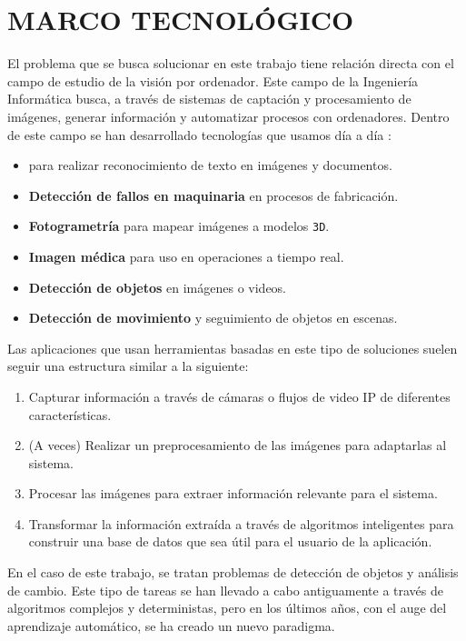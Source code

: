 \section{MARCO TECNOLÓGICO}

El problema que se busca solucionar en este trabajo tiene relación directa con el campo de estudio de la visión por ordenador. Este campo de la Ingeniería Informática busca, 
a través de sistemas de captación y procesamiento de imágenes, generar información y automatizar procesos con ordenadores. \newline Dentro de este campo se han desarrollado tecnologías que usamos día a día
\cite{szeliskiComputerVisionAlgorithms2022}:

\begin{itemize}
    \item \textbf{\textit{}} para realizar reconocimiento de texto en imágenes y documentos.
    \item \textbf{Detección de fallos en maquinaria} en procesos de fabricación.
    \item \textbf{Fotogrametría} para mapear imágenes a modelos \texttt{3D}.
    \item \textbf{Imagen médica} para uso en operaciones a tiempo real\cite{NEMESIS3DCM}.
    \item \textbf{Detección de objetos} en imágenes o videos.
    \item \textbf{Detección de movimiento} y seguimiento de objetos en escenas.
\end{itemize}

Las aplicaciones que usan herramientas basadas en este tipo de soluciones suelen seguir una estructura similar a la siguiente:

\begin{enumerate}
    \item Capturar información a través de cámaras o flujos de video IP de diferentes características.
    \item (A veces) Realizar un preprocesamiento de las imágenes para adaptarlas al sistema.
    \item Procesar las imágenes para extraer información relevante para el sistema.
    \item Transformar la información extraída a través de algoritmos inteligentes para construir una base de datos que sea útil para el usuario de la aplicación.
\end{enumerate}

En el caso de este trabajo, se tratan problemas de detección de objetos y análisis de cambio. Este tipo de tareas se han llevado a cabo antiguamente a través de algoritmos complejos y deterministas, pero en los últimos 
años, con el auge del aprendizaje automático, se ha creado un nuevo paradigma.

